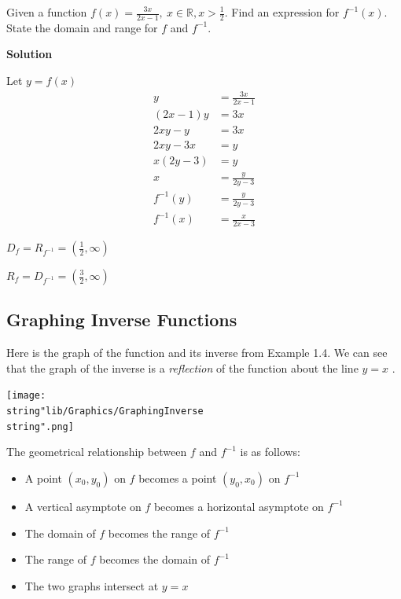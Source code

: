 \documentclass[11pt,a4paper]{book}
\newcommand{\R}{\mathbb{R}}
\begin{document}
\newpage

\begin{example}{}

Given a function ${\displaystyle f\left(x\right)=\frac{3x}{2x-1}},\:x\in\R,x>{\displaystyle \frac{1}{2}}$. Find an expression for $f^{-1}\left(x\right)$. State the domain and range for $f$ and $f^{-1}$.

\textbf{Solution}

Let ${\displaystyle y=f\left(x\right)}$
\begin{align*}
y & =\frac{3x}{2x-1}\\
\left(2x-1\right)y & =3x\\
2xy-y & =3x\\
2xy-3x & =y\\
x\left(2y-3\right) & =y\\
x & =\frac{y}{2y-3}\\
f^{-1}\left(y\right) & =\frac{y}{2y-3}\\
f^{-1}\left(x\right) & =\frac{x}{2x-3}
\end{align*}

${\displaystyle D_{f}=R_{f^{-1}}=\left(\frac{1}{2},\infty\right)}$

${\displaystyle R_{f}=D_{f^{-1}}=\left(\frac{3}{2},\infty\right)}$
\end{example}


\subsection{Graphing Inverse Functions}
\begin{minipage}{.6\textwidth}
Here is the graph of the function and its inverse from \textsf{Example 1.4}. We can see that the graph of the inverse is a \textit{reflection} of the function about the line $y=x$ .
\end{minipage}
\begin{minipage}{.35\textwidth}
\begin{center}
\texttt{[image: \\string"lib/Graphics/GraphingInverse\\string".png]}
\par\end{center}
\end{minipage}
\begin{tcolorbox}[colback=blue!5, colframe=black,boxrule=.4pt, sharpish corners]

The geometrical relationship between $f$ and $f^{-1}$ is as follows:
\begin{itemize}
\item A point $\left(x_{0},y_{0}\right)$ on $f$ becomes a point $\left(y_{0},x_{0}\right)$
on $f^{-1}$
\item A vertical asymptote on $f$ becomes a horizontal asymptote on $f^{-1}$
\item The domain of $f$ becomes the range of $f^{-1}$
\item The range of $f$ becomes the domain of $f^{-1}$
\item The two graphs intersect at $y=x$
\end{itemize}
\end{tcolorbox}
\end{document}
